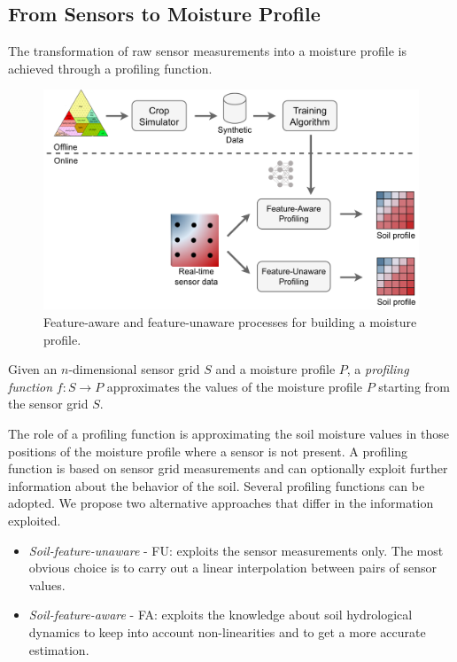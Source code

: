 \subsection{From Sensors to Moisture Profile}
\label{pluto-sec:FromSensorsToMoistureProfile}
The transformation of raw sensor measurements into a moisture profile is achieved through a profiling function.
\begin{figure}[t]
\centering
\includegraphics[width=1\textwidth]{chapters/physics-aware/pluto/img/process.pdf}
\caption{Feature-aware and feature-unaware processes for building a moisture profile.}
\label{pluto-fig:process}
\end{figure}
\begin{definition}
Given an $n$-dimensional sensor grid $S$ and a moisture profile $P$, a \emph{profiling function} $f : S \rightarrow P$ approximates the values of the moisture profile $P$ starting from the sensor grid $S$.
\end{definition}

The role of a profiling function is approximating the soil moisture values in those positions of the moisture profile where a sensor is not present. 
A profiling function is based on sensor grid measurements and can optionally exploit further information about the behavior of the soil. 
Several profiling functions can be adopted. 
We propose two alternative approaches that differ in the information exploited.
\begin{itemize}
    \item \emph{Soil-feature-unaware} - FU: exploits the sensor measurements only. The most obvious choice is to carry out a linear interpolation between pairs of sensor values.
    \item \emph{Soil-feature-aware} - FA: exploits the knowledge about soil hydrological dynamics to keep into account non-linearities and to get a more accurate estimation.
\end{itemize}

